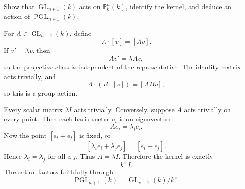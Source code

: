 \begin{problem}\label{prob:vi36-13}
Show that \(\operatorname{GL}_{n+1}(k)\) acts on \(\mathbb P^n_k(k)\), identify the kernel, and deduce an action of
\(\operatorname{PGL}_{n+1}(k)\).

\end{problem}

\ifdefined\FullProblemDossiers
\begin{solution}
For \(A\in\operatorname{GL}_{n+1}(k)\), define
\[
A\cdot[v]=[Av].
\]
If \(v'=\lambda v\), then
\[
Av'=\lambda Av,
\]
so the projective class is independent of the representative. The identity matrix acts trivially, and
\[
A\cdot(B\cdot[v])=[ABv],
\]
so this is a group action.

Every scalar matrix \(\lambda I\) acts trivially. Conversely, suppose \(A\) acts trivially on every point. Then each
basis vector \(e_i\) is an eigenvector:
\[
Ae_i=\lambda_i e_i.
\]
Now the point \([e_i+e_j]\) is fixed, so
\[
[\lambda_i e_i+\lambda_j e_j]
=
[e_i+e_j].
\]
Hence \(\lambda_i=\lambda_j\) for all \(i,j\). Thus \(A=\lambda I\). Therefore the kernel is exactly
\[
k^\times I.
\]
The action factors faithfully through
\[
\boxed{
\operatorname{PGL}_{n+1}(k)
=
\operatorname{GL}_{n+1}(k)/k^\times.
}
\]
\end{solution}
\fi
